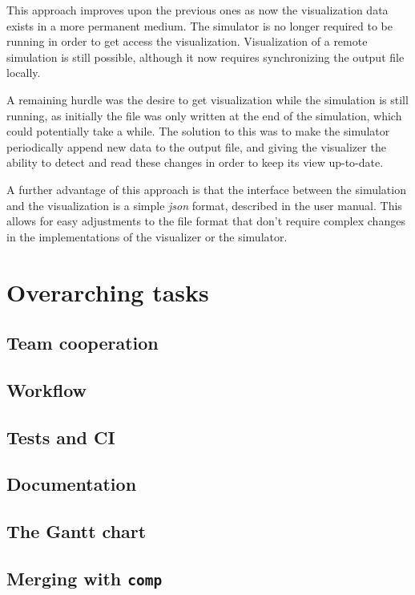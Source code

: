 \documentclass[a4paper,12pt]{article}
\begin{document}
This approach improves upon the previous ones as now the visualization data exists in a more permanent medium. The simulator is no longer required to be running in order to get access the visualization. Visualization of a remote simulation is still possible, although it now requires synchronizing the output file locally.

A remaining hurdle was the desire to get visualization while the simulation is still running, as initially the file was only written at the end of the simulation, which could potentially take a while. The solution to this was to make the simulator periodically append new data to the output file, and giving the visualizer the ability to detect and read these changes in order to keep its view up-to-date.

A further advantage of this approach is that the interface between the simulation and the visualization is a simple \textit{json} format, described in the user manual. This allows for easy adjustments to the file format that don't require complex changes in the implementations of the visualizer or the simulator.

\section{Overarching tasks}
\subsection{Team cooperation} %
\subsection{Workflow} %
\subsection{Tests and CI} %
\subsection{Documentation}
\subsection{The Gantt chart}
\subsection{Merging with \texttt{comp}}

\pagebreak
\printbibliography
\end{document}
